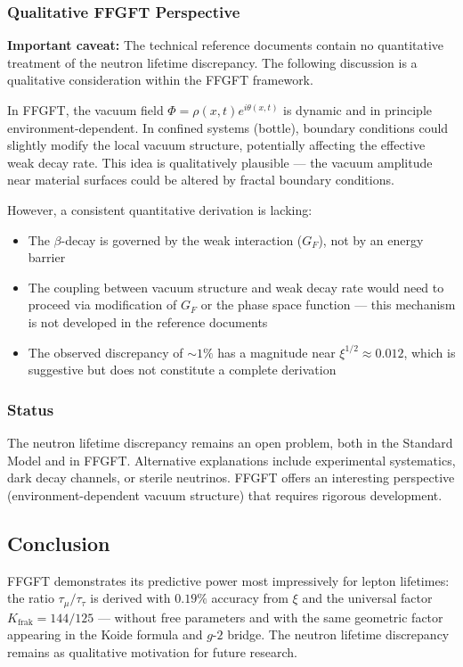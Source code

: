	\subsubsection*{Qualitative FFGFT Perspective}
	
	\textbf{Important caveat:} The technical reference documents contain no quantitative treatment of the neutron lifetime discrepancy. The following discussion is a qualitative consideration within the FFGFT framework.
	
	In FFGFT, the vacuum field \(\Phi = \rho(x,t)e^{i\theta(x,t)}\) is dynamic and in principle environment-dependent. In confined systems (bottle), boundary conditions could slightly modify the local vacuum structure, potentially affecting the effective weak decay rate. This idea is qualitatively plausible — the vacuum amplitude near material surfaces could be altered by fractal boundary conditions.
	
	However, a consistent quantitative derivation is lacking:
	
	\begin{itemize}
		\item The \(\beta\)-decay is governed by the weak interaction (\(G_F\)), not by an energy barrier
		\item The coupling between vacuum structure and weak decay rate would need to proceed via modification of \(G_F\) or the phase space function — this mechanism is not developed in the reference documents
		\item The observed discrepancy of \(\sim 1\%\) has a magnitude near \(\xi^{1/2} \approx 0.012\), which is suggestive but does not constitute a complete derivation
	\end{itemize}
	
	\subsubsection*{Status}
	
	The neutron lifetime discrepancy remains an open problem, both in the Standard Model and in FFGFT. Alternative explanations include experimental systematics, dark decay channels, or sterile neutrinos. FFGFT offers an interesting perspective (environment-dependent vacuum structure) that requires rigorous development.
	
	\subsection*{Conclusion}
	
	FFGFT demonstrates its predictive power most impressively for lepton lifetimes: the ratio \(\tau_\mu/\tau_\tau\) is derived with \(0.19\%\) accuracy from \(\xi\) and the universal factor \(K_\text{frak} = 144/125\) — without free parameters and with the same geometric factor appearing in the Koide formula and \(g\)-\(2\) bridge. The neutron lifetime discrepancy remains as qualitative motivation for future research.


